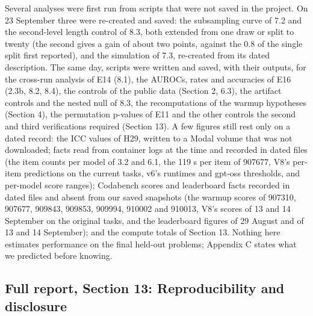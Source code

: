 Several analyses were first run from scripts that were not saved in the project. On 23 September three were re-created and saved: the subsampling curve of 7.2 and the second-level length control of 8.3, both extended from one draw or split to twenty (the second gives a gain of about two points, against the 0.8 of the single split first reported), and the simulation of 7.3, re-created from its dated description. The same day, scripts were written and saved, with their outputs, for the cross-run analysis of E14 (8.1), the AUROCs, rates and accuracies of E16 (2.3b, 8.2, 8.4), the controls of the public data (Section 2, 6.3), the artifact controls and the nested null of 8.3, the recomputations of the warmup hypotheses (Section 4), the permutation p-values of E11 and the other controls the second and third verifications required (Section 13). A few figures still rest only on a dated record: the ICC values of H29, written to a Modal volume that was not downloaded; facts read from container logs at the time and recorded in dated files (the item counts per model of 3.2 and 6.1, the 119 s per item of 907677, V8's per-item predictions on the current tasks, v6's runtimes and gpt-oss thresholds, and per-model score ranges); Codabench scores and leaderboard facts recorded in dated files and absent from our saved snapshots (the warmup scores of 907310, 907677, 909843, 909853, 909994, 910002 and 910013, V8's scores of 13 and 14 September on the original tasks, and the leaderboard figures of 29 August and of 13 and 14 September); and the compute totals of Section 13. Nothing here estimates performance on the final held-out problems; Appendix C states what we predicted before knowing.

\subsection*{Full report, Section 13: Reproducibility and disclosure}

